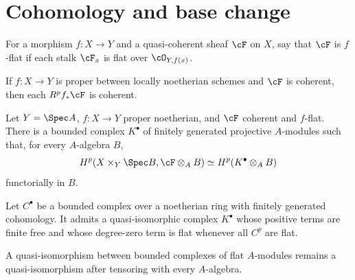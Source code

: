 \section{Cohomology and base change}
\label{mumford-II5}

\begin{definition}
\label{mumford-def-f-flat}
For a morphism $f:X\to Y$ and a quasi-coherent sheaf $\cF$ on $X$, say that
$\cF$ is $f$-flat if each stalk $\cF_x$ is flat over $\cO_{Y,f(x)}$.
\notready
\end{definition}

\begin{theorem}
\label{mumford-thm-proper-direct-image-coherent}
If $f:X\to Y$ is proper between locally noetherian schemes and $\cF$ is
coherent, then each $R^pf_*\cF$ is coherent.
\notready
\end{theorem}

\begin{theorem}
\label{mumford-thm-grothendieck-complex}
Let $Y=\Spec A$, $f:X\to Y$ proper noetherian, and $\cF$ coherent and
$f$-flat.  There is a bounded complex $K^\bullet$ of finitely generated
projective $A$-modules such that, for every $A$-algebra $B$,
\[
H^p(X\times_Y\Spec B,\cF\otimes_A B)\simeq
H^p(K^\bullet\otimes_A B)
\]
functorially in $B$.
\notready
\end{theorem}

\begin{lemma}
\label{mumford-lem-flat-complex-replacement}
Let $C^\bullet$ be a bounded complex over a noetherian ring with finitely
generated cohomology.  It admits a quasi-isomorphic complex $K^\bullet$ whose
positive terms are finite free and whose degree-zero term is flat whenever all
$C^p$ are flat.
\notready
\end{lemma}

\begin{lemma}
\label{mumford-lem-flat-quasi-iso-base-change}
A quasi-isomorphism between bounded complexes of flat $A$-modules remains a
quasi-isomorphism after tensoring with every $A$-algebra.
\notready
\end{lemma}


